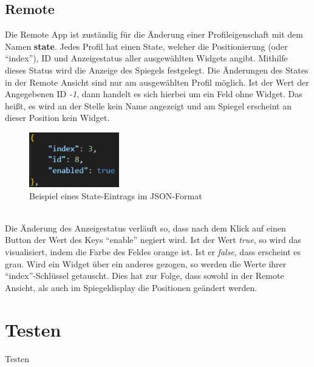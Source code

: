 \subsection{Remote}
Die Remote App ist zuständig für die Änderung einer Profileigenschaft mit dem Namen \textbf{state}. Jedes Profil hat einen State, welcher die Positionierung (oder \enquote{index}), ID und Anzeigestatus aller ausgewählten Widgets angibt. Mithilfe dieses Status wird die Anzeige des Spiegels festgelegt. Die Änderungen des States in der Remote Ansicht sind nur am ausgewählten Profil möglich. Ist der Wert der Angegebenen ID \textit{-1}, dann handelt es sich hierbei um ein Feld ohne Widget. Das heißt, es wird an der Stelle kein Name angezeigt und am Spiegel erscheint an dieser Position kein Widget.
\begin{figure}[h]
    \centering
    \includegraphics[width=0.35\textwidth]{pictures/remote_state.png}
    \captionsetup{justification=centering, labelformat=simple, singlelinecheck=false}
    \caption{Beispiel eines State-Eintrags im JSON-Format}
    \label{fig:remote_state}
\end{figure} \\
Die Änderung des Anzeigestatus verläuft so, dass nach dem Klick auf einen Button der Wert des Keys \enquote{enable} negiert wird. Ist der Wert \textit{true}, so wird das visualisiert, indem die Farbe des Feldes orange ist. Ist er \textit{false}, dass erscheint es grau. Wird ein Widget über ein anderes gezogen, so werden die Werte ihrer \enquote{index}-Schlüssel getauscht. Dies hat zur Folge, dass sowohl in der Remote Ansicht, als auch im Spiegeldisplay die Positionen geändert werden.

\section{Testen}
Testen
